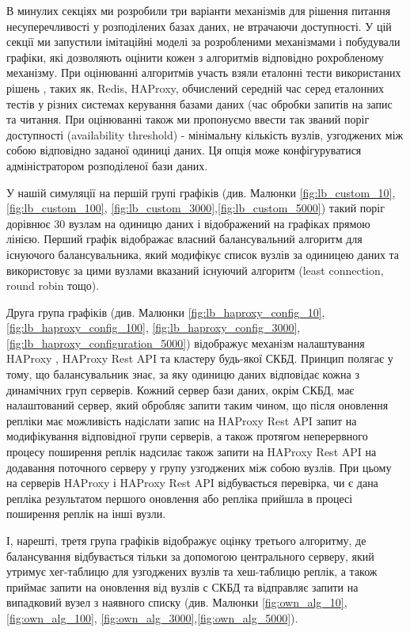 \documentclass[14pt]{vakthesis}
\begin{document}
В минулих секціях ми розробили три варіанти механізмів для рішення питання несуперечливості у розподілених базах даних, не втрачаючи доступності.
У цій секції ми запустили імітаційні моделі за розробленими механізмами і побудували графіки, які дозволяють оцінити кожен з алгоритмів відповідно рохробленому механізму.
При оцінюванні алгоритмів участь взяли еталонні тести використаних рішень , таких як, Redis, HAProxy, обчислений середній час серед еталонних тестів у різних системах керування базами даних (час обробки запитів на запис та читання.
При оцінюванні також ми пропонуємо ввести так званий поріг доступності (availability threshold) - мінімальну кількість вузлів, узгоджених між собою відповідно заданої одиниці даних. Ця опція може конфігуруватися адміністратором розподіленої бази даних. 

У нашій симуляції на першій групі графіків (див. Малюнки \ref{fig:lb_custom_10}, \ref{fig:lb_custom_100}, \ref{fig:lb_custom_3000},\ref{fig:lb_custom_5000}) такий поріг дорівнює 30 вузлам на одиницю даних
і відображений на графіках прямою лінією. Перший графік відображає власний балансувальний алгоритм для існуючого балансувальника, який модифікує список вузлів за одиницею даних та використовує за цими вузлами вказаний існуючий алгоритм (least connection, round robin тощо). 

Друга група графіків (див. Малюнки \ref{fig:lb_haproxy_config_10}, \ref{fig:lb_haproxy_config_100}, \ref{fig:lb_haproxy_config_3000},\ref{fig:lb_haproxy_configuration_5000}) відображує механізм налаштування HAProxy , HAProxy Rest API та кластеру будь-якої СКБД. Принцип полягає у тому, що балансувальник знає, за яку одиницю даних відповідає кожна з динамічних груп серверів. Кожний сервер бази даних, окрім СКБД, має налаштований сервер, який обробляє запити таким чином, що після оновлення репліки має можливість надіслати запис на HAProxy Rest API запит на модифікування відповідної групи серверів, а також протягом неперервного процесу поширення реплік надсилає також запити на HAProxy Rest API на додавання поточного серверу у групу узгоджених між собою вузлів. При цьому на серверів HAProxy і HAProxy Rest API відбувається перевірка, чи є дана репліка результатом першого оновлення або репліка прийшла в процесі поширення реплік на інші вузли.

І, нарешті, третя група графіків відображує оцінку третього алгоритму, де балансування відбувається тільки за допомогою центрального серверу, який утримує хег-таблицю для узгоджених вузлів та хеш-таблицю реплік, а також приймає запити на оновлення від вузлів с СКБД та відправляє  запити на випадковий вузел з наявного списку (див. Малюнки \ref{fig:own_alg_10}, \ref{fig:own_alg_100}, \ref{fig:own_alg_3000},\ref{fig:own_alg_5000}).
\end{document}
